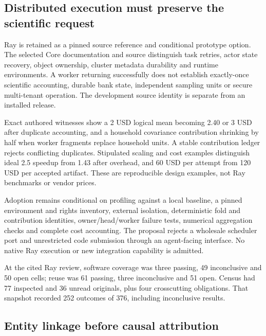 \hypertarget{distributed-execution-must-preserve-the-scientific-request}{%
\subsection{Distributed execution must preserve the scientific
request}\label{distributed-execution-must-preserve-the-scientific-request}}

Ray is retained as a pinned source reference and conditional prototype
option. The selected Core documentation and source distinguish task
retries, actor state recovery, object ownership, cluster metadata
durability and runtime environments. A worker returning successfully
does not establish exactly-once scientific accounting, durable bank
state, independent sampling units or secure multi-tenant operation. The
development source identity is separate from an installed release.
\citep{exec24_ray_sources}

Exact authored witnesses show a 2 USD logical mean becoming 2.40 or 3
USD after duplicate accounting, and a household covariance contribution
shrinking by half when worker fragments replace household units. A
stable contribution ledger rejects conflicting duplicates. Stipulated
scaling and cost examples distinguish ideal 2.5 speedup from 1.43 after
overhead, and 60 USD per attempt from 120 USD per accepted artifact.
These are reproducible design examples, not Ray benchmarks or vendor
prices. \citep{exec24_ray_contract}

Adoption remains conditional on profiling against a local baseline, a
pinned environment and rights inventory, external isolation,
deterministic fold and contribution identities, owner/head/worker
failure tests, numerical aggregation checks and complete cost
accounting. The proposal rejects a wholesale scheduler port and
unrestricted code submission through an agent-facing interface. No
native Ray execution or new integration capability is admitted.
\citep{exec24_ray_contract}

At the cited Ray review, software coverage was three passing, 49
inconclusive and 50 open cells; reuse was 61 passing, three inconclusive
and 51 open. Census had 77 inspected and 36 unread originals, plus four
crosscutting obligations. That snapshot recorded 252 outcomes of 376,
including inconclusive results. \citep{sp24ray_reader,sp24ray_progress}

\hypertarget{entity-linkage-before-causal-attribution}{%
\subsection{Entity linkage before causal
attribution}\label{entity-linkage-before-causal-attribution}}

